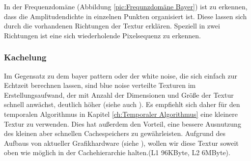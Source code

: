 In der Frequenzdomäne (Abbildung \ref{pic:Frequnzdomäne Bayer}) ist zu erkennen, dass die Amplitudendichte in einzelnen
Punkten organisiert ist. Diese lassen sich durch die vorhandenen
Richtungen der Textur erklären. Speziell in zwei Richtungen ist eine sich
wiederholende Pixelsequenz zu erkennen.

\subsubsection{Kachelung}
\label{ch:Content1:sec:blue noise:Kachelung}

Im Gegensatz zu dem bayer pattern oder der white noise, die sich einfach zur Echtzeit berechnen lassen,
sind blue noise verteilte Texturen im Erstellungsaufwand, der mit Anzahl der Dimensionen 
und Größe der Textur schnell anwächst, deutlich höher (siehe auch \cite{bluenoisechrisschied}). 
Es empfiehlt sich daher für den temporalen Algorithmus in Kapitel \ref{ch:Temporaler Algorithmus} eine 
kleinere Textur zu verwenden.
Dies hat außerdem den Vorteil, eine bessere Ausnutzung des kleinen aber schnellen Cachespeichers zu gewährleisten.
Aufgrund des Aufbaus von aktueller Grafikhardware (siehe \cite{turingarchitecture}), wollen wir diese Textur
soweit oben wie möglich in der Cachehierarchie halten.(L1 96KByte, L2 6MByte).

